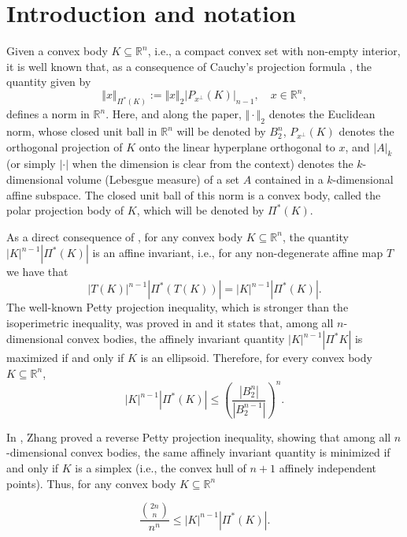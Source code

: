 \documentclass{amsart}
\newcommand{\R}{\mathbb R}
\theoremstyle{remark}
\theoremstyle{definition}
\numberwithin{equation}{section}
\begin{document}
\section{Introduction and notation}


Given a convex body $K\subseteq\R^n$, i.e., a compact convex set with non-empty interior, it is well known that, as a consequence of Cauchy's projection formula \cite[Eq. (A.45)]{G}, the quantity given by
$$
\Vert x\Vert_{\Pi^*(K)}:=\Vert x\Vert_2|P_{x^\perp}(K)|_{n-1},\quad x\in\R^n,
$$
defines a norm in $\R^n$. Here, and along the paper, $\Vert\cdot\Vert_2$ denotes the Euclidean norm, whose closed unit ball in $\R^n$ will be denoted by $B_2^n$,  $P_{x^\perp}(K)$ denotes the orthogonal projection of $K$ onto the linear hyperplane orthogonal to $x$, and $|A|_k$ (or simply $|\cdot|$ when the dimension is clear from the context) denotes the $k$-dimensional volume (Lebesgue measure) of a set $A$ contained in a $k$-dimensional affine subspace. The closed unit ball of this norm is a convex body, called the polar projection body of $K$, which will be denoted by $\Pi^*(K)$.

As a direct consequence of \cite[Thm. 4.1.5]{G}, for any convex body $K\subseteq\R^n$, the quantity $|K|^{n-1}|\Pi^*(K)|$ is an affine invariant, i.e., for any non-degenerate affine map $T$ we have that $$|T(K)|^{n-1}|\Pi^*(T(K))|=|K|^{n-1}|\Pi^*(K)|.$$ The well-known Petty projection inequality, which is stronger than the isoperimetric inequality, was proved in \cite{Pe} and it states that, among all $n$-dimensional convex bodies, the affinely invariant quantity $|K|^{n-1}|\Pi^*K|$ is maximized if and only if $K$ is an ellipsoid. Therefore, for every convex body $K\subseteq\R^n$,
\begin{equation}\label{eq:Petty}
|K|^{n-1}|\Pi^*(K)|\leq\left(\frac{|B_2^n|}{\left|B_2^{n-1}\right|}\right)^n.
\end{equation}

In \cite{Zh}, Zhang proved a reverse Petty projection inequality, showing that among all $n$-dimensional convex bodies, the same affinely invariant quantity is minimized if and only if $K$ is a simplex (i.e., the convex hull of $n+1$ affinely independent points). Thus, for any convex body $K\subseteq\R^n$

\begin{equation}\label{eq:Zhang}
\frac{{{2n}\choose{n}}}{n^n}\leq|K|^{n-1}|\Pi^*(K)|.
\end{equation}
\end{document}
